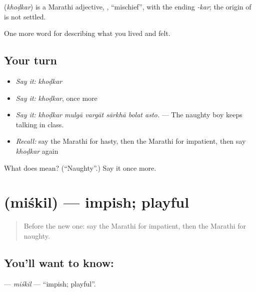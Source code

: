 \begin{cousinweb}
\textbf{} (\emph{khoḍkar}) is a Marathi adjective, , \textquotedblleft{}mischief\textquotedblright{}, with the ending \emph{-kar}; the origin of  is not settled.
\end{cousinweb}

\begin{grammarlens}[title={What you've built}]
One more word for describing what you lived and felt.
\end{grammarlens}

\subsection*{Your turn}
\begin{itemize}
\raggedright
  \item \emph{Say it:} \emph{khoḍkar}
  \item \emph{Say it:} \emph{khoḍkar}, once more
  \item \emph{Say it:} \emph{khoḍkar mulgā vargāt sārkhā bolat asto.} — The naughty boy keeps talking in class.
  \item \emph{Recall:} say the Marathi for hasty, then the Marathi for impatient, then say \emph{khoḍkar} again
\end{itemize}

\begin{tcolorbox}[breakable,colback=teal!4,colframe=teal!35!black,title={Before you move on}]
What does  mean? (\textquotedblleft{}Naughty\textquotedblright{}.) Say it once more.
\end{tcolorbox}
\section[\texorpdfstring{\mr{मिश्किल} (miśkil)}{मिश्किल (miśkil)}]{ (miśkil) — impish; playful}

\label{lesson:MR-C473-miskil}



\begin{quote}
Before the new one: say the Marathi for impatient, then the Marathi for naughty.
\end{quote}

\subsection*{You'll want to know: }
\textbf{} — \emph{miśkil} — \textquotedblleft{}impish; playful\textquotedblright{}.

